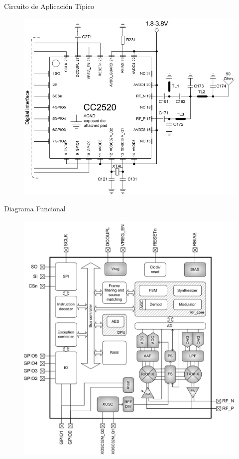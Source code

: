 \documentclass[aspectratio=169, handout]{beamer}
\begin{document}
\begin{frame}{Circuito de Aplicación Típico}	
	\begin{figure}[H]
		\includegraphics[height=1\textheight]{./imagenes/applicationcircuit.jpg}
	\end{figure}	
\end{frame}

\begin{frame}{Diagrama Funcional}
	\begin{figure}[H]
		\includegraphics[height=1\textheight]{./imagenes/diagrama.jpg}
	\end{figure}	
\end{frame}
\end{document}
